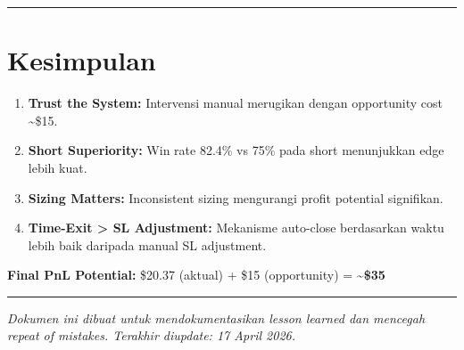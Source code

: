 \documentclass[
  11pt,
  a4paper,
]{article}
\providecommand{\tightlist}{%
  \setlength{\itemsep}{0pt}\setlength{\parskip}{0pt}}
\begin{document}
\begin{center}\rule{0.5\linewidth}{0.5pt}\end{center}

\section{Kesimpulan}\label{kesimpulan}

\begin{enumerate}
\def\labelenumi{\arabic{enumi}.}
\tightlist
\item
  \textbf{Trust the System:} Intervensi manual merugikan dengan
  opportunity cost \textasciitilde\$15.
\item
  \textbf{Short Superiority:} Win rate 82.4\% vs 75\% pada short
  menunjukkan edge lebih kuat.
\item
  \textbf{Sizing Matters:} Inconsistent sizing mengurangi profit
  potential signifikan.
\item
  \textbf{Time-Exit \textgreater{} SL Adjustment:} Mekanisme auto-close
  berdasarkan waktu lebih baik daripada manual SL adjustment.
\end{enumerate}

\textbf{Final PnL Potential:} \$20.37 (aktual) + \$15 (opportunity) =
\textbf{\textasciitilde\$35}

\begin{center}\rule{0.5\linewidth}{0.5pt}\end{center}

\emph{Dokumen ini dibuat untuk mendokumentasikan lesson learned dan
mencegah repeat of mistakes. Terakhir diupdate: 17 April 2026.}
\end{document}
